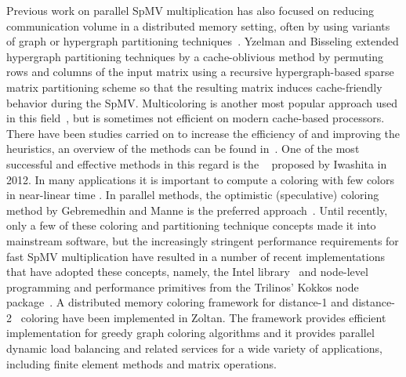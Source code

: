 Previous work on parallel SpMV multiplication has also focused on reducing communication volume in a distributed memory setting, often by using variants of graph or hypergraph partitioning techniques~\cite{Catalyurek:1999}. Yzelman and Bisseling \cite{doi:10.1137/080733243,Yzelman-thesis-2011} extended hypergraph partitioning techniques by a cache-oblivious method by permuting rows and columns of the input matrix using a recursive hypergraph-based sparse matrix partitioning scheme so that the resulting matrix induces cache-friendly behavior during the SpMV. Multicoloring is another most popular approach used in this field~\cite{MC}, but is sometimes not efficient on modern cache-based processors. There have been studies carried on to increase the efficiency of  and improving the heuristics, an overview of the methods can be found in~\cite{dist_k_def,COLPACK,equitable_color}. One of the most successful and effective methods in this regard is the \ABMCfull~\cite{ABMC} proposed by Iwashita \etal in 2012. In many applications it is important to compute a coloring with few colors in near-linear time \cite{doi:10.1137/13093426X}. In parallel methods, the optimistic (speculative) coloring method by Gebremedhin and Manne \cite{gebremedhin2000scalable} is the preferred approach~\cite{Boman:2016}. 
Until recently, only a few of these coloring and partitioning technique concepts made it into mainstream software, but the increasingly stringent performance requirements for fast SpMV multiplication have resulted in a number of recent implementations that have adopted these concepts, namely, the Intel \MKL library~\cite{MKL} and node-level programming and performance primitives from the Trilinos’ Kokkos node package~\cite{kokkos}. A distributed memory coloring framework for distance-1\cite{BOZDAG2008515} and distance-2~\cite{doi:10.1137/080732158} coloring have been implemented in Zoltan. The framework provides efficient implementation for greedy graph coloring algorithms and it provides parallel dynamic load balancing and related services for a wide variety of applications, including finite element methods and matrix operations.


